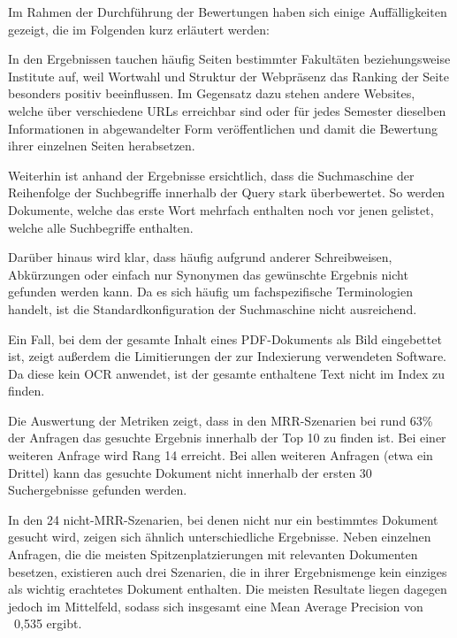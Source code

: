 Im Rahmen der Durchführung der Bewertungen haben sich einige Auffälligkeiten gezeigt, die im Folgenden kurz erläutert werden: 

\begin{description}

\item In den Ergebnissen tauchen häufig Seiten bestimmter Fakultäten beziehungsweise Institute auf, weil Wortwahl und Struktur der Webpräsenz das Ranking der Seite besonders positiv beeinflussen. Im Gegensatz dazu stehen andere Websites, welche über verschiedene URLs erreichbar sind oder für jedes Semester dieselben Informationen in abgewandelter Form veröffentlichen und damit die Bewertung ihrer einzelnen Seiten herabsetzen.

\item Weiterhin ist anhand der Ergebnisse ersichtlich, dass die Suchmaschine der Reihenfolge der Suchbegriffe innerhalb der Query stark überbewertet. So werden Dokumente, welche das erste Wort mehrfach enthalten noch vor jenen gelistet, welche alle Suchbegriffe enthalten.

\item Darüber hinaus wird klar, dass häufig aufgrund anderer Schreibweisen, Abkürzungen oder einfach nur Synonymen das gewünschte Ergebnis nicht gefunden werden kann. Da es sich häufig um fachspezifische Terminologien handelt, ist die Standardkonfiguration der Suchmaschine nicht ausreichend.

\item Ein Fall, bei dem der gesamte Inhalt eines PDF-Dokuments als Bild eingebettet ist, zeigt außerdem die Limitierungen der zur Indexierung verwendeten Software. Da diese kein OCR anwendet, ist der gesamte enthaltene Text nicht im Index zu finden.

\end{description}

Die Auswertung der Metriken zeigt, dass in den MRR-Szenarien bei rund 63\% der Anfragen das gesuchte Ergebnis innerhalb der Top 10 zu finden ist. Bei einer weiteren Anfrage wird Rang 14 erreicht. Bei allen weiteren Anfragen (etwa ein Drittel) kann das gesuchte Dokument nicht innerhalb der ersten 30 Suchergebnisse gefunden werden.
 
In den 24 nicht-MRR-Szenarien, bei denen nicht nur ein bestimmtes Dokument gesucht wird, zeigen sich ähnlich unterschiedliche Ergebnisse. Neben einzelnen Anfragen, die die meisten Spitzenplatzierungen mit relevanten Dokumenten besetzen, existieren auch drei Szenarien, die in ihrer Ergebnismenge kein einziges als wichtig erachtetes Dokument enthalten. Die meisten Resultate liegen dagegen jedoch im Mittelfeld, sodass sich insgesamt eine Mean Average Precision von ~0,535 ergibt.
